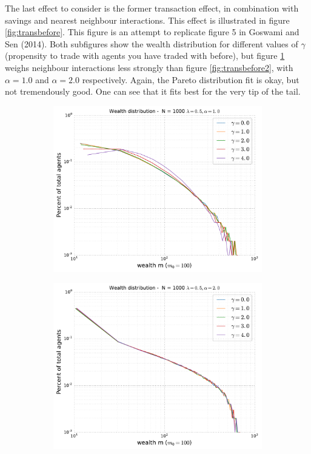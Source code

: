 \documentclass[10pt, a4paper]{amsart}
\begin{document}

The last effect to consider is the former transaction effect, in combination with savings and nearest neighbour interactions. This effect is illustrated in figure \ref{fig:transbefore}. This figure is an attempt to replicate figure 5 in Goswami and Sen (2014)\cite{GoswamiSen}. Both subfigures show the wealth distribution for different values of $\gamma$ (propensity to trade with agents you have traded with before), but figure \ref{fig:transbefore1} weighs neighbour interactions less strongly than figure \ref{fig:transbefore2}, with $\alpha=1.0$ and $\alpha=2.0$ respectively. Again, the Pareto distribution fit is okay, but not tremendously good. One can see that it fits best for the very tip of the tail.

\begin{figure}
\begin{subfigure}{.49\textwidth}
	\centering
	\includegraphics[width=\linewidth]{../figures/5e/5e_05-10-var.pdf}
	\caption{}
	\label{fig:transbefore1}
\end{subfigure}
\begin{subfigure}{.49\textwidth}
	\centering
	\includegraphics[width=\linewidth]{../figures/5e/5e_05-20-var.pdf}

\end{subfigure}
\end{figure}
\end{document}
